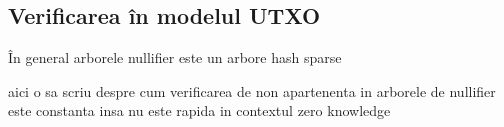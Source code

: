 \documentclass[12pt, letterpaper]{article}
\begin{document}
\subsection{Verificarea în modelul UTXO }
În general arborele nullifier este un arbore hash sparse 

aici o sa scriu despre cum verificarea de non apartenenta in arborele de nullifier este constanta insa nu este rapida in contextul zero knowledge



\printbibliography
\end{document}
